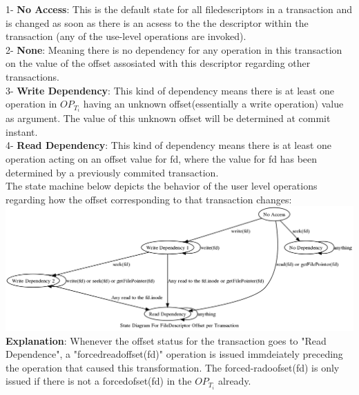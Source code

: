 \documentclass[a4paper, 11pt]{article}
\begin{document}
1- \textbf{No Access}: This is the default state for all filedescriptors in a transaction and is changed as soon as there is an acsess to the the descriptor within the transaction (any of the use-level operations are invoked).\\

2- \textbf{None}: Meaning there is no dependency for any operation in this transaction on the value of the offset assosiated with this descriptor regarding other transactions.\\ %

3- \textbf{Write Dependency}: This kind of dependency means there is at least one operation in $OP_{T_i}$ having an unknown offset(essentially a write operation) value as argument. The value of this unknown offset will be determined at commit instant. \\

4- \textbf{Read Dependency}: This kind of dependency means there is at least one operation acting on an offset value for fd, where the value for fd has been determined by a previously commited transaction.\\


The state machine below depicts the behavior of the user level operations regarding how the offset corresponding to that transaction changes: \\

\includegraphics[scale = 0.3]{hello.png}\\

\textbf{Explanation}: Whenever the offset status for the transaction goes to "Read Dependence", a "forcedreadoffset(fd)" operation is issued immdeiately preceding the operation that caused this transformation. The forced-radoofset(fd) is only issued if there is not a forcedofset(fd) in the $OP_{T_i}$ already.\\ 
\end{document}
